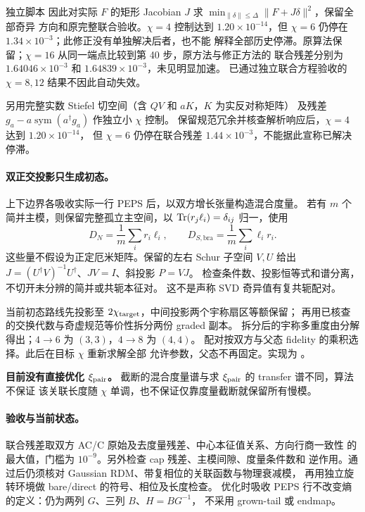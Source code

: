 独立脚本  因此对实际 $F$ 的矩形
Jacobian $J$ 求 $\min_{\|\delta\|\leq\Delta}\|F+J\delta\|^2$，保留全部奇异
方向和原完整联合验收。$\chi=4$ 控制达到 $1.20\times10^{-14}$，但
$\chi=6$ 仍停在 $1.34\times10^{-3}$；此修正没有单独解决后者，也不能
解释全部历史停滞。原算法保留；$\chi=16$ 从同一端点比较到第 40 步，原方法与修正方法的
联合残差分别为 $1.64046\times10^{-3}$ 和 $1.64839\times10^{-3}$，未见明显加速。
已通过独立联合方程验收的 $\chi=8,12$ 结果不因此自动失效。

另用完整实数 Stiefel 切空间（含 $QV$ 和 $aK$，$K$ 为实反对称矩阵）
及残差 $g_a-a\operatorname{sym}(a^\dagger g_a)$ 作独立小 $\chi$ 控制。
保留规范冗余并核查解析响应后，$\chi=4$ 达到 $1.20\times10^{-14}$，
但 $\chi=6$ 仍停在联合残差 $1.44\times10^{-3}$，不能据此宣称已解决停滞。

\paragraph{双正交投影只生成初态。}
上下边界各吸收实际一行 PEPS 后，以双方增长张量构造混合度量。
若有 $m$ 个简并主模，则保留完整孤立主空间，以
$\operatorname{Tr}(r_j\ell_i)=\delta_{ij}$ 归一，使用
\begin{equation}
 D_N=\frac1m\sum_i r_i\ell_i,\qquad
 D_{S,\mathrm{bra}}=\frac1m\sum_i\ell_i r_i.
\end{equation}
这些量不假设为正定厄米矩阵。保留的左右 Schur 子空间 $V,U$ 给出
$J=(U^\dagger V)^{-1}U^\dagger$、$JV=I$、斜投影 $P=VJ$。
检查条件数、投影恒等式和谱分离，不切开未分辨的简并或共轭本征对。
这不是声称 SVD 奇异值有复共轭配对。

当前初态路线先投影至 $2\chi_{\rm target}$，中间投影两个宇称扇区等额保留；
再用已核查的交换代数与奇虚规范等价性拆分两份 graded 副本。
拆分后的宇称多重度由分解得出；$4\to6$ 为 $(3,3)$，$4\to8$ 为 $(4,4)$。
配对按双方与父态 fidelity 的乘积选择。此后在目标 $\chi$ 重新求解全部
允许参数，父态不再固定。实现为 。

\textbf{目前没有直接优化 $\xi_{\rm pair}$。}
截断的混合度量谱与求 $\xi_{\rm pair}$ 的 transfer 谱不同，算法不保证
该关联长度随 $\chi$ 单调，也不保证仅靠度量截断就保留所有慢模。

\paragraph{验收与当前状态。}
联合残差取双方 AC/C 原始及去度量残差、中心本征值关系、方向行商一致性
的最大值，门槛为 $10^{-9}$。另外检查 cap 残差、主模间隙、度量条件数和
逆作用。通过后仍须核对 Gaussian RDM、带复相位的关联函数与物理衰减模，
再用独立旋转环境做 bare/direct 的符号、相位及长度检查。
优化时吸收 PEPS 行不改变熵的定义：仍为两列 $G$、三列 $B$、$H=BG^{-1}$，
不采用 grown-tail 或 endmap。

